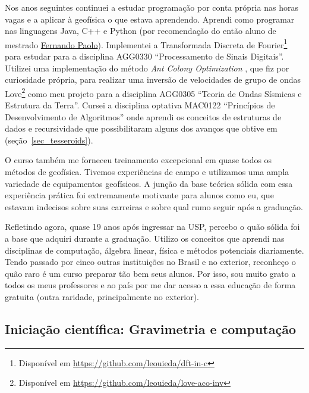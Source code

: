 \documentclass[10pt,a4paper,oneside]{book}
\begin{document}
Nos anos seguintes continuei a estudar programação por conta própria nas horas
vagas e a aplicar à geofísica o que estava aprendendo.
Aprendi como programar nas linguagens Java, C++ e Python (por recomendação do
então aluno de mestrado \href{https://www.linkedin.com/in/fspaolo/}{Fernando Paolo}).
Implementei a Transformada Discreta de Fourier\footnote{Disponível em
\url{https://github.com/leouieda/dft-in-c}} para estudar para a disciplina
AGG0330 ``Processamento de Sinais Digitais''.
Utilizei uma implementação do método \textit{Ant Colony Optimization}
\citep{Socha2008}, que fiz por curiosidade própria, para realizar uma inversão
de velocidades de grupo de ondas
Love\footnote{Disponível em \url{https://github.com/leouieda/love-aco-inv}}
como meu projeto para a disciplina AGG0305 ``Teoria de Ondas Sísmicas e
Estrutura da Terra''.
Cursei a disciplina optativa MAC0122 ``Princípios de Desenvolvimento de
Algoritmos'' onde aprendi os conceitos de estruturas de dados e recursividade
que possibilitaram alguns dos avanços que obtive em \citet{Uieda2016}
(seção~\ref{sec_tesseroids}).

O curso também me forneceu treinamento excepcional em quase todos os métodos de
geofísica.
Tivemos experiências de campo e utilizamos uma ampla variedade de equipamentos
geofísicos.
A junção da base teórica sólida com essa experiência prática foi
extremamente motivante para alunos como eu, que estavam indecisos sobre suas
carreiras e sobre qual rumo seguir após a graduação.

Refletindo agora, quase 19 anos após ingressar na USP, percebo o quão sólida
foi a base que adquiri durante a graduação. Utilizo os conceitos que aprendi
nas disciplinas de computação, álgebra linear, física e métodos potenciais
diariamente. Tendo passado por cinco outras instituições no Brasil e no
exterior, reconheço o quão raro é um curso preparar tão bem seus alunos.
Por isso, sou muito grato a todos os meus professores e ao país por me dar
acesso a essa educação de forma gratuita (outra raridade, principalmente no
exterior).

\subsection{Iniciação científica: Gravimetria e computação}
\label{sec_ic_tesseroids}
\end{document}
